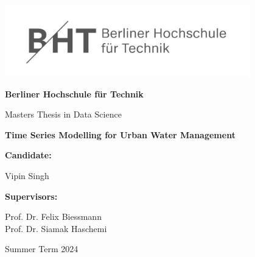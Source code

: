 \begin{titlepage}
    \begin{center}
        \vspace*{1cm}

        \includegraphics[width=0.8\textwidth]{bht_logo}

        \vspace*{1cm}

        \LARGE
        \textbf{Berliner Hochschule für Technik}

        \vspace{0.5cm}
        \LARGE
        Masters Thesis in Data Science

        \vspace*{1.5cm}
            
        \Huge
        \textbf{Time Series Modelling for Urban Water Management}
            
                    
        \vspace{2cm}

        \Large
        \begin{minipage}[t]{0.4\textwidth}
             \textbf{Candidate:}
        \end{minipage}
        \hfill
        \begin{minipage}[t]{0.45\textwidth}
            \raggedleft
            Vipin Singh
        \end{minipage}
            
            
        \vspace{2cm}
            
           
        \Large
        \begin{minipage}[t]{0.4\textwidth}
             \textbf{Supervisors:}
        \end{minipage}
        \hfill
        \begin{minipage}[t]{0.45\textwidth}
            \raggedleft
            Prof. Dr. Felix Biessmann\\
            Prof. Dr. Siamak Haschemi\\
        \end{minipage}
        
        \vspace{3cm}
        Summer Term 2024
            
    \end{center}
\end{titlepage}